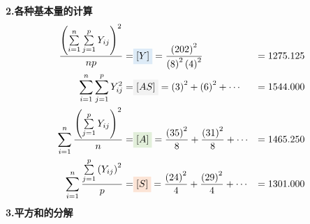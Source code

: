 \textbf{2.各种基本量的计算}
    \begin{align*}
            \frac{
                \left(
        	\sum\limits_{i=1}^{n} \sum\limits_{j=1}^{p}Y_{ij}
                \right)^2}
            {np}=& \colorbox[rgb]{ .867,  .922,  .969}{$[Y]$} = 
            \frac{
                \left(
        	    202
                \right)^2}
                {
                    \left(
        	           8
                    \right)^2
                    \left(
                        4
                    \right)^2
                }&=1275.125\\
            \sum\limits_{i=1}^{n} \sum\limits_{j=1}^{p}Y_{ij}^2=
            & \colorbox[rgb]{ .949,  .949,  .949}{$[AS]$} = 
            \left(
            	3
            \right)^2 +
            \left(
            	6
            \right)^2    +\cdots &=1544.000\\
            \sum\limits_{i=1}^{n}
            \frac
                {\left(
	            \sum\limits_{j=1}^{p}Y_{ij}
                \right)^2}
                {n}=
            &\colorbox[rgb]{ .886,  .937,  .855}{$[A]$}=
            \frac{\left(35\right)^2}{8}+\frac{\left(31\right)^2}{8}+\cdots&=1465.250\\
            \sum\limits_{i=1}^{n}
            \frac
            {
                \sum\limits_{j=1}^{p}\left(Y_{ij} \right)^2
            }
            {
                p            
            }            
            =&\colorbox[rgb]{ .988,  .894,  .839}{$[S]$}
            =\frac{\left( 24 \right)^2}{4} + \frac{\left( 29 \right)^2}{4} + \cdots &= 1301.000
    \end{align*}
\textbf{3.平方和的分解}

